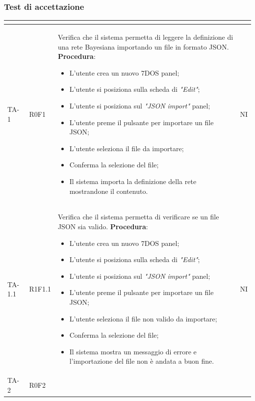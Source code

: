 \subsubsection{Test di accettazione}
\normalsize
\renewcommand{\arraystretch}{1}
\begin{longtable}{|C{2.5cm}|C{2.5cm}|L{6.5cm}|C{1.5cm}|}
	\hline
	\textbf{\color{title_text}{Test}} & \textbf{\color{title_text}{Requisito}} & \textbf{\color{title_text}{Descrizione}} & \textbf{\color{title_text}{Stato}} \\
	\hline
	\endhead
	{TA-1} & {R0F1} & 
	Verifica che il sistema permetta di leggere la definizione di una rete Bayesiana importando un file in formato JSON.
	\textbf{Procedura}:
	\begin{itemize}		
		\item L'utente crea un nuovo 7DOS panel;
		\item L'utente si posiziona sulla scheda di \emph{"Edit"};
		\item L'utente si posiziona sul \emph{"JSON import"} panel;
		\item L'utente preme il pulsante per importare un file JSON;
		\item L'utente seleziona il file da importare;
		\item Conferma la selezione del file;
		\item Il sistema importa la definizione della rete mostrandone il contenuto.
	\end{itemize}
	  & {NI}\\
	\hline
	{TA-1.1} & {R1F1.1} & Verifica che il sistema permetta di verificare se un file JSON sia valido.
	\textbf{Procedura}:
	\begin{itemize}		
		\item L'utente crea un nuovo 7DOS panel;
		\item L'utente si posiziona sulla scheda di \emph{"Edit"};
		\item L'utente si posiziona sul \emph{"JSON import"} panel;
		\item L'utente preme il pulsante per importare un file JSON;
		\item L'utente seleziona il file non valido da importare;
		\item Conferma la selezione del file;
		\item Il sistema mostra un messaggio di errore e l'importazione del file non è andata a buon fine.
	\end{itemize}
	 & {NI}\\
	\hline
	{TA-2} & {R0F2} & 

\end{longtable}
